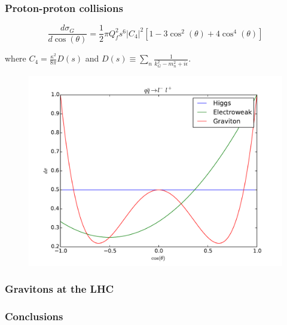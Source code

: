 \documentclass[10pt]{beamer}
\begin{document}
	\begin{frame}
		\frametitle{Proton-proton collisions}
		\begin{equation}
		\frac{d\sigma_{G}}{d\cos(\theta)} = \frac{1}{2}\pi Q_f^2s^6|C_4|^2\left[1-3\cos^2(\theta) + 4\cos^4(\theta)\right]
		\end{equation}
		
		where $C_4 = \frac{\kappa^2}{8\pi} D(s)$ and $D(s) \equiv \sum_{n} \frac{1}{k_G^2 - m_n^2 + i\epsilon}$.
		
		\begin{figure}[H]
			\centering
			\includegraphics[scale=0.2]{../angDist.pdf}
		\end{figure}
		
	\end{frame}
	
	\begin{frame}
		\frametitle{Gravitons at the LHC}
	\end{frame}
	
	\begin{frame}
		\frametitle{Conclusions}
	\end{frame}
	
\end{document}
